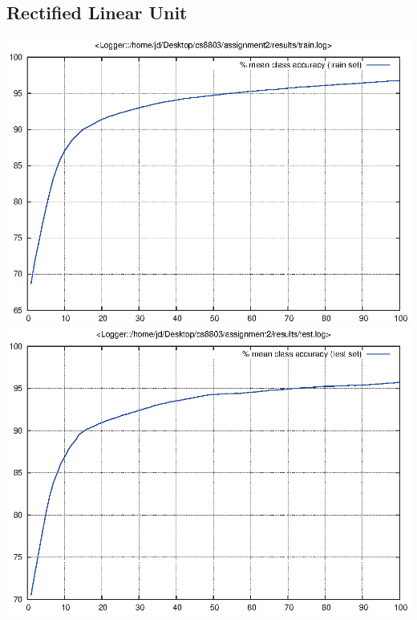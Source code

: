 \documentclass[twoside,12pt]{article}
\newcommand{\imsize}{0.5\linewidth}
\begin{document}
\subsection{Rectified Linear Unit}
\includegraphics[width=\imsize]{assignment2/results/relu_train}
\includegraphics[width=\imsize]{assignment2/results/relu_test}
\end{document}
